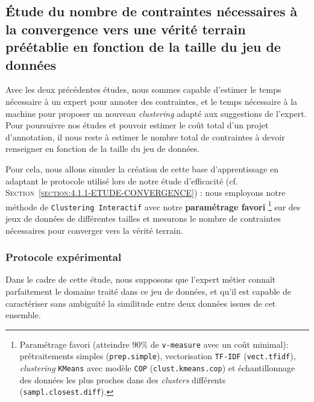 	\subsection{Étude du nombre de contraintes nécessaires à la convergence vers une vérité terrain préétablie en fonction de la taille du jeu de données}
	\label{section:4.3.3-ETUDE-COUT-NOMBRE-CONTRAINTES}
			
		Avec les deux précédentes études, nous sommes capable d'estimer le temps nécessaire à un expert pour annoter des contraintes, et le temps nécessaire à la machine pour proposer un nouveau \textit{clustering} adapté aux suggestions de l'expert.
		Pour poursuivre nos études et pouvoir estimer le coût total d'un projet d'annotation, il nous reste à estimer le nombre total de contraintes à devoir renseigner en fonction de la taille du jeu de données.
		
		Pour cela, nous allons simuler la création de cette base d'apprentissage en adaptant le protocole utilisé lors de notre étude d'efficacité (cf. \textsc{Section~\ref{section:4.1.1-ETUDE-CONVERGENCE}}) :
		nous employons notre méthode de \texttt{Clustering Interactif} avec notre \textbf{paramétrage favori} \footnote{
			Paramétrage favori (atteindre $90$\% de \texttt{v-measure} avec un coût minimal): prétraitements simples (\texttt{prep.simple}), vectorisation \texttt{TF-IDF} (\texttt{vect.tfidf}), \textit{clustering} \texttt{KMeans} avec modèle \texttt{COP} (\texttt{clust.kmeans.cop}) et échantillonnage des données les plus proches dans des \textit{clusters} différents (\texttt{sampl.closest.diff}).
		} sur des jeux de données de différentes tailles et mesurons le nombre de contraintes nécessaires pour converger vers la vérité terrain.
	
		\subsubsection{Protocole expérimental}
			
			\begin{leftBarWarning}
				Dans le cadre de cette étude, nous supposons que l'expert métier connaît parfaitement le domaine traité dans ce jeu de données, et qu'il est capable de caractériser sans ambiguïté la similitude entre deux données issues de cet ensemble.
			\end{leftBarWarning}
			

